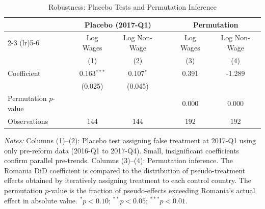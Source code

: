 \begin{table}[htbp]
\centering
\small
\begin{threeparttable}
\caption{Robustness: Placebo Tests and Permutation Inference}
\label{tab:robustness}
\begin{tabular}{lccccc}
\toprule
 & \multicolumn{2}{c}{Placebo (2017-Q1)} & & \multicolumn{2}{c}{Permutation} \\
\cmidrule(lr){2-3} \cmidrule(lr){5-6}
 & Log Wages & Log Non-Wage & & Log Wages & Log Non-Wage \\
 & (1) & (2) & & (3) & (4) \\
\midrule
Coefficient & 0.163$^{***}$ & 0.107$^{*}$ & & 0.391 & -1.289 \\
 & (0.025) & (0.045) & & & \\
\midrule
Permutation $p$-value & & & & 0.000 & 0.000 \\
Observations & 144 & 144 & & 192 & 192 \\
\bottomrule
\end{tabular}
\begin{tablenotes}[flushleft]\footnotesize
\item \textit{Notes:} Columns (1)--(2): Placebo test assigning false treatment at 2017-Q1 using only pre-reform data (2016-Q1 to 2017-Q4). Small, insignificant coefficients confirm parallel pre-trends. Columns (3)--(4): Permutation inference. The Romania DiD coefficient is compared to the distribution of pseudo-treatment effects obtained by iteratively assigning treatment to each control country. The permutation $p$-value is the fraction of pseudo-effects exceeding Romania's actual effect in absolute value. $^{*}p<0.10$; $^{**}p<0.05$; $^{***}p<0.01$.
\end{tablenotes}
\end{threeparttable}
\end{table}
